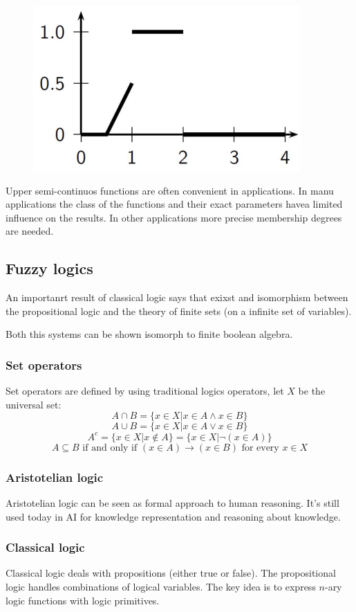 \documentclass{article}
\begin{document}
\begin{figure}[H]
    \centering
    \includegraphics[scale=0.5]{images/fuzzy-number.png}
\end{figure}
Upper semi-continuos functions are often convenient in applications. In manu applications the class
of the functions and their exact parameters havea limited influence on the results. In other applications
more precise membership degrees are needed.

\subsection{Fuzzy logics}
An importanrt result of classical logic says that exixst and isomorphism between the propositional
logic and the theory of finite sets (on a infinite set of variables).

Both this systems can be shown isomorph to finite boolean algebra.
\subsubsection{Set operators}
Set operators are defined by using traditional logics operators, let $X$ be the universal set:
$$A\cap B=\{x\in X| x\in A \land x\in B\}$$
$$A\cup B=\{x\in X| x\in A \lor x\in B\}$$
$$A^c = \{x\in X|x \notin A\} = \{x\in X|\lnot (x\in A)\}$$
$$A\subseteq B\text{ if and only if } (x\in A)\rightarrow(x\in B) \text{ for every } x\in X$$

\subsubsection{Aristotelian logic}
Aristotelian logic can be seen as formal approach to human reasoning. It's still used today in AI for
knowledge representation and reasoning about knowledge.

\subsubsection{Classical logic}
Classical logic deals with propositions (either true or false). The propositional logic handles combinations
of logical variables. The key idea is to express $n$-ary logic functions with logic primitives.
\end{document}
